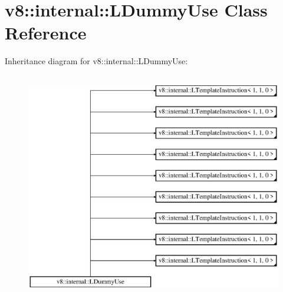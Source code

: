 \hypertarget{classv8_1_1internal_1_1_l_dummy_use}{}\section{v8\+:\+:internal\+:\+:L\+Dummy\+Use Class Reference}
\label{classv8_1_1internal_1_1_l_dummy_use}
Inheritance diagram for v8\+:\+:internal\+:\+:L\+Dummy\+Use\+:\begin{figure}[H]
\begin{center}
\leavevmode
\includegraphics[height=10.000000cm]{classv8_1_1internal_1_1_l_dummy_use}
\end{center}
\end{figure}
